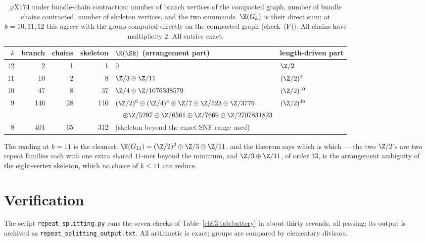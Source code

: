 \begin{table}[ht]
\centering\footnotesize
\begin{tabular}{rrrrll}
\toprule
$k$ & branch & chains & skeleton & $\K(\Sk)$ (arrangement part) & length-driven part\\
\midrule
12 &   2 &  1 &   1 & $0$ & $\Z/2$\\
11 &  10 &  2 &   8 & $\Z/3\oplus\Z/11$ & $(\Z/2)^{2}$\\
10 &  47 &  8 &  37 & $\Z/4\oplus\Z/1076338579$ & $(\Z/2)^{10}$\\
 9 & 146 & 28 & 110 & $(\Z/2)^{6}\oplus(\Z/4)^{4}\oplus\Z/7\oplus\Z/523\oplus\Z/3779$ & $(\Z/2)^{36}$\\
   &     &    &     & $\quad\oplus\Z/5297\oplus\Z/6561\oplus\Z/7669\oplus\Z/2707831823$ & \\
 8 & 401 & 65 & 312 & (skeleton beyond the exact-SNF range used) & \\
\bottomrule
\end{tabular}
\caption{$\varphi$X174 under bundle-chain contraction: number of branch vertices of the
compacted graph, number of bundle chains contracted, number of skeleton vertices, and the
two summands. $\K(G_k)$ is their direct sum; at $k=10,11,12$ this agrees with the group
computed directly on the compacted graph (check~(F)). All chains have multiplicity $2$.
All entries exact.}
\label{ch03:tab:phix}
\end{table}

The reading at $k=11$ is the cleanest: $\K(G_{11})=(\Z/2)^{2}\oplus\Z/3\oplus\Z/11$, and
the theorem says which is which --- the two $\Z/2$'s are two repeat families each with one
extra shared $11$-mer beyond the minimum, and $\Z/3\oplus\Z/11$, of order $33$, is the
arrangement ambiguity of the eight-vertex skeleton, which no choice of $k\le11$ can
reduce.

\section{Verification}\label{ch03:sec:battery}

The script \texttt{repeat\_splitting.py} runs the seven checks of Table~\ref{ch03:tab:battery}
in about thirty seconds, all passing; its output is archived as
\texttt{repeat\_splitting\_output.txt}. All arithmetic is exact; groups are compared by
elementary divisors.

